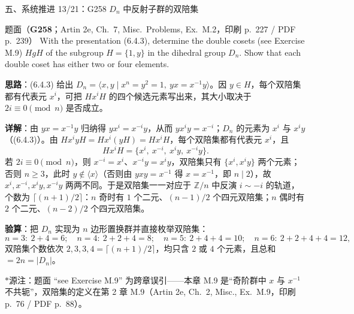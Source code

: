 \documentclass[aspectratio=169,10pt,fontset=none]{ctexbeamer}
\newcommand{\ex}[1]{\textcolor{accent}{\footnotesize\bfseries #1}}
\newcommand{\key}[1]{\textcolor{ink}{\bfseries #1}}
\newcommand{\starpt}{\textcolor{accent}{\bfseries$\ast$}}
\begin{document}
\begin{frame}[t]{五、系统推进 13/21：G258 $D_n$ 中反射子群的双陪集}
\label{ex:G258}
\scriptsize
\begin{block}{\footnotesize 题面（\ex{G258}；Artin 2e, Ch.~7, Misc.\ Problems, Ex.~M.2，印刷 p.~227 / PDF p.~239）}
With the presentation (6.4.3), determine the double cosets (see Exercise M.9) $HgH$ of the subgroup $H=\{1,y\}$ in the dihedral group $D_n$. Show that each double coset has either two or four elements.
\end{block}
\key{思路}：(6.4.3) 给出 $D_n=\langle x,y\mid x^n=y^2=1,\ yx=x^{-1}y\rangle$。因 $y\in H$，每个双陪集都有代表元 $x^i$，可把 $Hx^iH$ 的四个候选元素写出来，其大小取决于 $2i\equiv0\pmod n$ 是否成立。

\key{详解}：由 $yx=x^{-1}y$ 归纳得 $yx^i=x^{-i}y$，从而 $yx^iy=x^{-i}$；$D_n$ 的元素为 $x^i$ 与 $x^iy$（(6.4.3)）。由 $Hx^iyH=Hx^i(yH)=Hx^iH$，每个双陪集都有代表元 $x^i$，且
\[
Hx^iH=\{x^i,\ x^{-i},\ x^iy,\ x^{-i}y\}.
\]
若 $2i\equiv0\pmod n$，则 $x^{-i}=x^i$、$x^{-i}y=x^iy$，双陪集只有 $\{x^i,x^iy\}$ 两个元素；否则 $n\ge3$，此时 $y\notin\langle x\rangle$（否则由 $yxy=x^{-1}$ 得 $x=x^{-1}$，即 $n\mid2$），故 $x^i,x^{-i},x^iy,x^{-i}y$ 两两不同。于是双陪集一一对应于 $\mathbb Z/n$ 中反演 $i\sim-i$ 的轨道，个数为 $\lceil (n+1)/2\rceil$：$n$ 奇时有 $1$ 个二元、$(n-1)/2$ 个四元双陪集；$n$ 偶时有 $2$ 个二元、$(n-2)/2$ 个四元双陪集。

\key{验算}：把 $D_n$ 实现为 $n$ 边形置换群并直接枚举双陪集：
\[
n=3:\ 2+4=6;\quad n=4:\ 2+2+4=8;\quad n=5:\ 2+4+4=10;\quad n=6:\ 2+2+4+4=12,
\]
双陪集个数依次 $2,3,3,4=\lceil(n+1)/2\rceil$，均只含 $2$ 或 $4$ 个元素，且总和 $=2n=|D_n|$。

\starpt 源注：题面 “see Exercise M.9” 为跨章误引——本章 M.9 是“奇阶群中 $x$ 与 $x^{-1}$ 不共轭”，双陪集的定义在第 2 章 M.9（Artin 2e, Ch.~2, Misc., Ex.~M.9，印刷 p.~76 / PDF p.~88）。
\end{frame}
\end{document}
